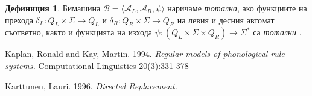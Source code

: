 \documentclass[11pt, oneside]{article}
\theoremstyle{definition}
\newtheorem{definition}{Дефиниция}[section]
\begin{document}
\begin{definition}
	Бимашина \( \mathcal{B} = \langle \mathcal{A}_L, \mathcal{A}_R, \psi \rangle \) наричаме \emph{тотална}, ако функциите на прехода \( \delta_L: Q_L \times \Sigma \to Q_L \) и \( \delta_R: Q_R \times \Sigma \to Q_R \) на левия и десния автомат съответно, както и функцията на изхода \( \psi: (Q_L \times \Sigma \times Q_R) \to \Sigma^* \) са \emph{тотални }.
\end{definition}


\begin{thebibliography}{9}
	Kaplan, Ronald and Kay, Martin. 1994.
	\textit{Regular models of phonological rule systems.}
	Computational Linguistics 20(3):331-378

	Karttunen, Lauri. 1996.
	\textit{Directed Replacement.}
	
\end{thebibliography}
	
\end{document}
